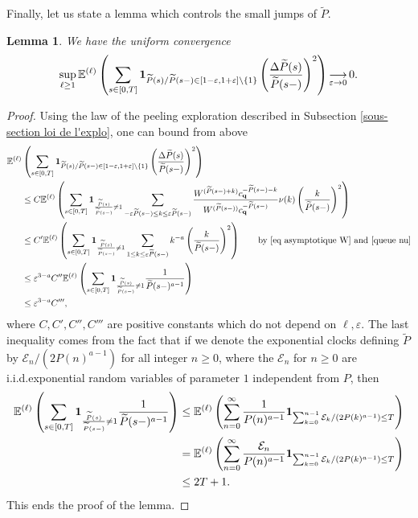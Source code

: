 \documentclass[11pt]{article}
\newtheorem{lemma}[theorem]{Lemma}
\numberwithin{equation}{section}
\def\vp{\varepsilon}
\def\E{\mathbb{E}}
\begin{document}
Finally, let us state a lemma which controls the small jumps of $\widetilde{P}$.
\begin{lemma}\label{lemme petits sauts de P}
	We have the uniform convergence
	$$
	\sup_{\ell \ge 1}
	\E^{(\ell)}
	\left(
	\sum_{s \in[0,T]} {\bf 1}_{\widetilde{P}(s)/\widetilde{P}(s-) \in [1-\vp,1+\vp]\setminus \{1\}}
	\left(\frac{\Delta \widetilde{P}(s)}{\widetilde{P}(s-)}\right)^2 
	\right)
	\mathop{\longrightarrow}\limits_{\vp \to 0}0.
	$$
\end{lemma}
\begin{proof}
	Using the law of the peeling exploration described in Subsection \ref{sous-section loi de l'explo}, one can {bound from above}
\begin{align*}
	\E^{(\ell)}
	&\left(
	\sum_{s \in[0,T] } {\bf 1}_{\widetilde{P}(s)/\widetilde{P}(s-) \in [1-\vp,1+\vp]\setminus \{1\}}
	\left(\frac{\Delta \widetilde{P}(s)}{\widetilde{P}(s-)}\right)^2 
	\right)
	\\
	&\le  C \E^{(\ell)}
	\left(
	\sum_{s \in[0,T]  } {\bf 1}_{\frac{\widetilde{P}(s)}{\widetilde{P}(s-)} \neq 1}
	\sum_{-\vp \widetilde{P}(s-) \le k \le \vp \widetilde{P}(s-)}
	\frac{W^{(\widetilde{P}(s-)+k)} c_{\bf q}^{-\widetilde{P}(s-)-k}}
	{W^{(\widetilde{P}(s-))} c_{\bf q}^{-\widetilde{P}(s-)}}
	\nu(k)
	\left(\frac{k}{\widetilde{P}(s-)}\right)^2 
	\right) \\
	&\le C'\E^{(\ell)}
	\left(
	\sum_{s \in[0,T] } {\bf 1}_{ \frac{\widetilde{P}(s)}{\widetilde{P}(s-)} \neq 1 }
	\sum_{1\le  k \le \vp \widetilde{P}(s-)}
	k^{-a}
	\left(\frac{k}{\widetilde{P}(s-)}\right)^2 
	\right) \qquad \text{by \eqref{eq asymptotique W} and \eqref{queue nu}}\\
	&\le \vp^{3-a} C''
	\E^{(\ell)}
	\left(
	\sum_{s \in[0,T] }{\bf 1}_{ \frac{\widetilde{P}(s)}{\widetilde{P}(s-)} \neq 1 }
	\frac{1}{\widetilde{P}(s-)^{a-1}}
	\right) \\
	&\le \vp^{3-a} C''',
\end{align*}
where $C,C',C'',C'''$ are positive constants which do not depend on $\ell, \vp$. The last inequality comes from the fact that if we denote the exponential clocks defining $\widetilde{P}$ by $\mathcal{E}_n/(2P(n)^{a-1})$ for all integer $n\ge 0$, where the $\mathcal{E}_n$ for $n\ge 0$ are i.i.d.\@ exponential random variables of parameter $1$ independent from $P$, then
\begin{align*}
	\E^{(\ell)}
	\left(
	\sum_{s \in[0,T]}
	{\bf 1}_{ \frac{\widetilde{P}(s)}{\widetilde{P}(s-)} \neq 1 }
	\frac{1}{\widetilde{P}(s-)^{a-1}}
	\right)
	&\le 
	\E^{(\ell)}
	\left(
	\sum_{n=0}^\infty
	\frac{1}{P(n)^{a-1}}
	{\bf 1}_{\sum_{k=0}^{n-1} \mathcal{E}_k/(2P(k)^{a-1}) \le T}
	\right)\\
	&= 
	\E^{(\ell)}
	\left(
	\sum_{n=0}^\infty
	\frac{\mathcal{E}_n}{P(n)^{a-1}}
	{\bf 1}_{\sum_{k=0}^{n-1} \mathcal{E}_k/(2P(k)^{a-1}) \le T}
	\right)\\
	&\le 2T +1.
\end{align*}
This ends the proof of the lemma.
\end{proof}
\end{document}
